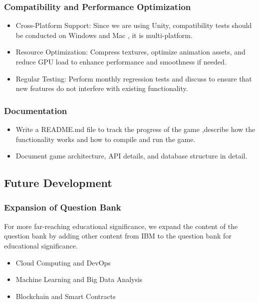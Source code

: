 \documentclass[11pt, a4paper]{article}
\begin{document}
\subsubsection{Compatibility and Performance Optimization}

\begin{itemize}
    \item Cross-Platform Support: Since we are using Unity, compatibility tests should be conducted on Windows and Mac , it is multi-platform.
    \item Resource Optimization: Compress textures, optimize animation assets, and reduce GPU load to enhance performance and smoothness if needed.
    \item Regular Testing: Perform monthly regression tests and discuss to ensure that new features do not interfere with existing functionality.
\end{itemize}

\subsubsection{Documentation}

\begin{itemize}
    \item Write a README.md file to track the progress of the game ,describe how the functionality works and how to compile and run the game.
    \item Document game architecture, API details, and database structure in detail.
\end{itemize}

\subsection{Future Development}

\subsubsection{Expansion of Question Bank}
\noindent For more far-reaching educational significance, we expand the content of the question bank by adding other content from IBM to the question bank for educational significance.

\begin{itemize}
    \item Cloud Computing and DevOps
    \item Machine Learning and Big Data Analysis
    \item Blockchain and Smart Contracts
\end{itemize}
\end{document}
